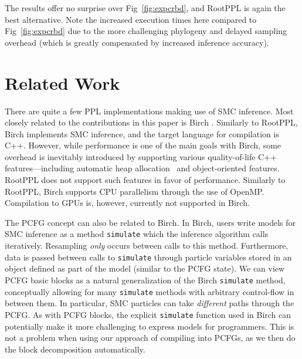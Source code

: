 \documentclass[runningheads]{llncs}
\begin{document}
The results offer no surprise over Fig~\ref{fig:expcrbd}, and RootPPL is again the best alternative.
Note the increased execution times here compared to Fig~\ref{fig:expcrbd} due to the more challenging phylogeny and delayed sampling overhead (which is greatly compensated by increased inference accuracy).


\section{Related Work}\label{sec:relwork}
There are quite a few PPL implementations making use of SMC inference.
Most closely related to the contributions in this paper is Birch \cite{murray2018automated}. Similarly to RootPPL, Birch implements SMC inference, and the target language for compilation is C++.
However, while performance is one of the main goals with Birch, some overhead is inevitably introduced by supporting various quality-of-life C++ features---including automatic heap allocation~\cite{murray2020lazy} and object-oriented features.
RootPPL does not support such features in favor of performance.
Similarly to RootPPL, Birch supports CPU parallelism through the use of OpenMP.
Compilation to GPUs is, however, currently not supported in Birch.

The PCFG concept can also be related to Birch.
In Birch, users write models for SMC inference as a method \lstinline!simulate! which the inference algorithm calls iteratively.
Resampling \emph{only} occurs between calls to this method.
Furthermore, data is passed between calls to \lstinline!simulate! through particle variables stored in an object defined as part of the model (similar to the PCFG state).
We can view PCFG basic blocks as a natural generalization of the Birch \lstinline!simulate! method, conceptually allowing for many \lstinline!simulate! methods with arbitrary control-flow in between them.
In particular, SMC particles can take \emph{different} paths through the PCFG.
As with PCFG blocks, the explicit \lstinline!simulate! function used in Birch can potentially make it more challenging to express models for programmers.
This is not a problem when using our approach of compiling into PCFGs, as we then do the block decomposition automatically.
\end{document}
